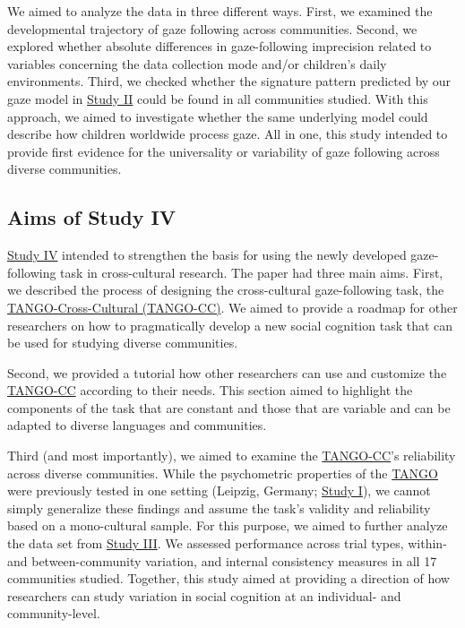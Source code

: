 \documentclass[
]{scrbook}
\begin{document}
We aimed to analyze the data in three different ways. First, we examined the developmental trajectory of gaze following across communities. Second, we explored whether absolute differences in gaze-following imprecision related to variables concerning the data collection mode and/or children's daily environments. Third, we checked whether the signature pattern predicted by our gaze model in \hyperref[studyII]{Study II} could be found in all communities studied. With this approach, we aimed to investigate whether the same underlying model could describe how children worldwide process gaze. All in one, this study intended to provide first evidence for the universality or variability of gaze following across diverse communities.

\subsection{Aims of Study IV}\label{aims-studyIV}

\hyperref[studyIV]{Study IV} intended to strengthen the basis for using the newly developed gaze-following task in cross-cultural research. The paper had three main aims. First, we described the process of designing the cross-cultural gaze-following task, the \hyperref[acronyms_TANGO-CC]{TANGO-Cross-Cultural (TANGO-CC)}. We aimed to provide a roadmap for other researchers on how to pragmatically develop a new social cognition task that can be used for studying diverse communities.

Second, we provided a tutorial how other researchers can use and customize the \hyperref[acronyms_TANGO-CC]{TANGO-CC} according to their needs. This section aimed to highlight the components of the task that are constant and those that are variable and can be adapted to diverse languages and communities.

Third (and most importantly), we aimed to examine the \hyperref[acronyms_TANGO-CC]{TANGO-CC}'s reliability across diverse communities. While the psychometric properties of the \hyperref[acronyms_TANGO]{TANGO} were previously tested in one setting (Leipzig, Germany; \hyperref[studyI]{Study I}), we cannot simply generalize these findings and assume the task's validity and reliability based on a mono-cultural sample. For this purpose, we aimed to further analyze the data set from \hyperref[studyIII]{Study III}. We assessed performance across trial types, within- and between-community variation, and internal consistency measures in all 17 communities studied. Together, this study aimed at providing a direction of how researchers can study variation in social cognition at an individual- and community-level.
\end{document}
